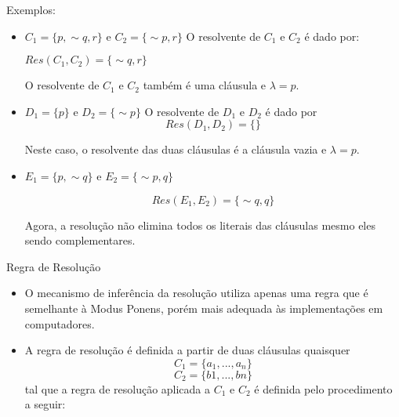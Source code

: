 \begin{frame}{Exemplos:}

\begin{itemize}
\itemsep 0.7cm

\item $C_1 = \{p,\sim q, r\}$ e $C_2 = \{ \sim p, r\}$ O resolvente de $C_1$ e $C_2$ é dado por:\\
\begin{center}
$Res(C_1,C_2) = \{ \sim q, r \}$
\end{center}

O resolvente de $C_1$ e $C_2$ também é uma cláusula e $\lambda = p$.\\

\item $D_1 = \{p\}$ e $D_2 = \{ \sim p\}$ O resolvente de $D_1$ e $D_2$ é dado por $$Res(D_1,D_2) = \{ \}$$

Neste caso, o resolvente das duas cláusulas é a cláusula vazia  e $\lambda = p$.
\end{itemize}
\end{frame}

\begin{frame}


\begin{itemize}
\itemsep 0.7cm

\item $E_1 = \{p, \sim q\}$ e $E_2 = \{ \sim p, q\}$

$$Res(E_1,E_2) = \{ \sim q, q\}$$

Agora, a resolução não elimina todos os literais das cláusulas mesmo eles sendo complementares.
\end{itemize}

\end{frame}

\begin{frame}{Regra de Resolução}

\begin{itemize}
\itemsep 0.7cm
\item O mecanismo de inferência da resolução utiliza apenas uma regra que é semelhante à Modus Ponens, porém mais adequada às implementações em computadores.

\item A regra de resolução é definida  a partir
de duas cláusulas quaisquer
$$C_1 = \{a_1,...,a_n \}$$ 
$$C_2 = \{ b1,...,bn\}$$
tal que a regra de resolução aplicada a $C_1$ e $C_2$ é definida pelo procedimento a seguir:
\end{itemize}
\end{frame}

